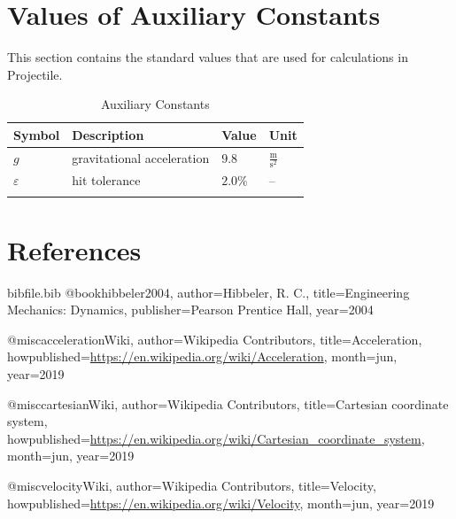 \documentclass[12pt]{article}
\begin{document}
\section{Values of Auxiliary Constants}
\label{Sec:AuxConstants}
This section contains the standard values that are used for calculations in Projectile.
\begin{longtable}{l l l l}
\toprule
\textbf{Symbol} & \textbf{Description} & \textbf{Value} & \textbf{Unit}
\\
\midrule
\endhead
$g$ & gravitational acceleration & $9.8$ & $\frac{\text{m}}{\text{s}^{2}}$
\\
$ε$ & hit tolerance & $2.0\%$ & --
\\
\bottomrule
\caption{Auxiliary Constants}
\label{Table:TAuxConsts}
\end{longtable}
\section{References}
\label{Sec:References}
\begin{filecontents*}{bibfile.bib}
@book{hibbeler2004,
author={Hibbeler, R. C.},
title={Engineering Mechanics: Dynamics},
publisher={Pearson Prentice Hall},
year={2004}}

@misc{accelerationWiki,
author={Wikipedia Contributors},
title={Acceleration},
howpublished={\url{https://en.wikipedia.org/wiki/Acceleration}},
month=jun,
year={2019}}

@misc{cartesianWiki,
author={Wikipedia Contributors},
title={Cartesian coordinate system},
howpublished={\url{https://en.wikipedia.org/wiki/Cartesian\_coordinate\_system}},
month=jun,
year={2019}}

@misc{velocityWiki,
author={Wikipedia Contributors},
title={Velocity},
howpublished={\url{https://en.wikipedia.org/wiki/Velocity}},
month=jun,
year={2019}}
\end{filecontents*}
\nocite{*}
\printbibliography[heading=none]
\end{document}

